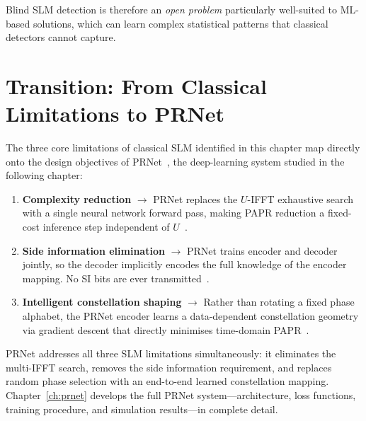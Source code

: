 Blind SLM detection is therefore an \emph{open problem} particularly
well-suited to ML-based solutions, which can learn complex statistical
patterns that classical detectors cannot capture.


\section{Transition: From Classical Limitations to PRNet}

The three core limitations of classical SLM identified in this chapter
map directly onto the design objectives of PRNet~\cite{kim2017novel},
the deep-learning system studied in the following chapter:

\begin{enumerate}
    \item \textbf{Complexity reduction} $\longrightarrow$
          PRNet replaces the $U$-IFFT exhaustive search with a single
          neural network forward pass, making PAPR reduction a
          fixed-cost inference step independent of $U$~\cite{kim2017novel}.

    \item \textbf{Side information elimination} $\longrightarrow$
          PRNet trains encoder and decoder jointly, so the decoder
          implicitly encodes the full knowledge of the encoder mapping.
          No SI bits are ever transmitted~\cite{kim2017novel}.

    \item \textbf{Intelligent constellation shaping} $\longrightarrow$
          Rather than rotating a fixed phase alphabet, the PRNet encoder
          learns a data-dependent constellation geometry via gradient
          descent that directly minimises time-domain
          PAPR~\cite{kim2017novel}.
\end{enumerate}

\begin{keyinsight}
    PRNet addresses all three SLM limitations simultaneously: it eliminates
    the multi-IFFT search, removes the side information requirement, and
    replaces random phase selection with an end-to-end learned
    constellation mapping.  Chapter~\ref{ch:prnet} develops the full
    PRNet system---architecture, loss functions, training procedure,
    and simulation results---in complete detail.
\end{keyinsight}
